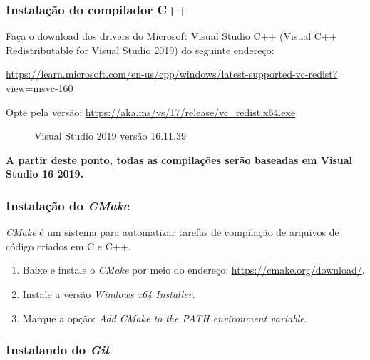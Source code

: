 \documentclass[a4paper,11pt]{article}
\newcommand{\cmake}{\textit{CMake}}
\newcommand{\cautionbox}[1]{
	\vskip 5mm
	\begin{leftbar}
		\textbf{#1}
	\end{leftbar}
	\vskip 5mm
}
\begin{document}
\subsubsection{Instalação do compilador C++}
\label{compilador}

Faça o download dos drivers do Microsoft Visual Studio C++ (Visual C++ Redistributable for Visual Studio 2019) do seguinte endereço:

\url{https://learn.microsoft.com/en-us/cpp/windows/latest-supported-vc-redist?view=msvc-160}

Opte pela versão: \url{https://aka.ms/vs/17/release/vc_redist.x64.exe}

\begin{figure}[H]
	\centering
	\caption{Visual Studio 2019 versão 16.11.39}\label{fig:msvc_build_2019}
\end{figure}

\cautionbox{\color{purple}A partir deste ponto, todas as compilações serão baseadas em \textbf{Visual Studio 16 2019}.}

\subsubsection{Instalação do \cmake{}}
\label{cmake}

\cmake{} é um sistema para automatizar tarefas de compilação de arquivos de código criados em C e C++. 

\begin{enumerate}
	\item Baixe e instale o \cmake{} por meio do endereço: \url{https://cmake.org/download/}.
	\item Instale a versão \textit{Windows x64 Installer}.
	\item Marque a opção: \textit{Add CMake to the PATH environment variable}.
\end{enumerate}


\subsubsection{Instalando do \textit{Git}}
\end{document}
